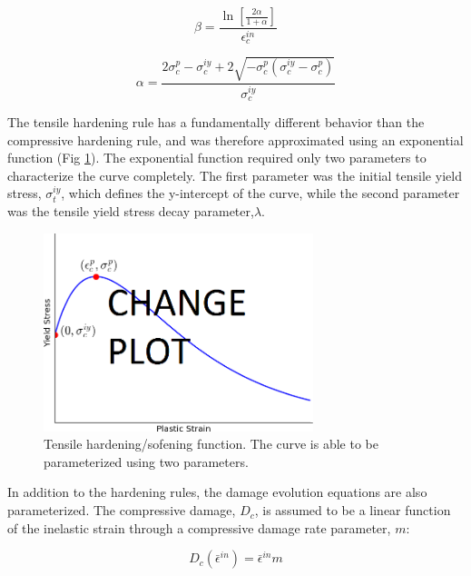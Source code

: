 \begin{equation}
\beta=\frac{\ln\left[\frac{2\alpha}{1+\alpha} \right ]}{\epsilon_c^{in}}
\label{eqn:c1}
\end{equation}

\begin{equation}
\alpha =\frac{2\sigma_c^{p}-\sigma_c^{iy}+2\sqrt{-\sigma_c^p\left(\sigma_c^{iy}-\sigma_c^p \right )}}{\sigma_c^{iy}}
\label{eqn:c2}
\end{equation}

The tensile hardening rule has a fundamentally different behavior than the compressive hardening rule, and was therefore approximated using an exponential function (Fig \ref{fig:tensionHardening}). The exponential function required only two parameters to characterize the curve completely. The first parameter was the initial tensile yield stress, $\sigma_{t}^{iy}$, which defines the y-intercept of the curve, while the second parameter was the tensile yield stress decay parameter,$\lambda$.

\begin{figure}[!htb]
\begin{center}
\includegraphics[width=0.7\textwidth]{figures/tensionHardening/tensionHardening}
\caption{{\label{fig:tensionHardening} Tensile hardening/sofening function. The curve is able to be parameterized using two parameters.%
}}
\end{center}
\end{figure}

In addition to the hardening rules, the damage evolution equations are also parameterized. The compressive damage, $D_c$, is assumed to be a linear function of the inelastic strain through a compressive damage rate parameter, $m$:

\begin{equation}
D_{c}\left(\bar{\epsilon}^{in}\right)=\bar{\epsilon}^{in}m\label{eqn:param3}
\end{equation}


